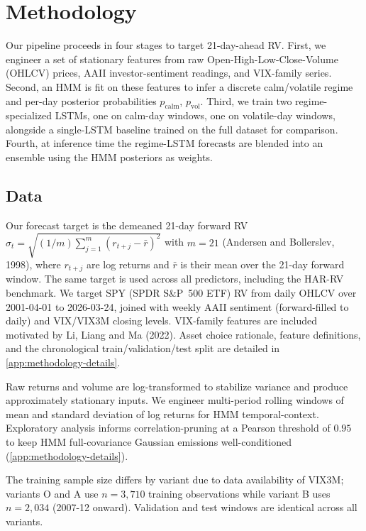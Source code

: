 \documentclass{article}
\begin{document}
\section{Methodology}

Our pipeline proceeds in four stages to target 21-day-ahead RV. First, we engineer a set of stationary features from raw Open-High-Low-Close-Volume (OHLCV) prices, AAII
  investor-sentiment readings, and VIX-family series. Second, an HMM is fit on these features to infer a discrete calm/volatile regime and per-day posterior
  probabilities $p_{\mathrm{calm}}$, $p_{\mathrm{vol}}$. Third, we train two regime-specialized LSTMs, one on calm-day windows, one on volatile-day windows, alongside a
  single-LSTM baseline trained on the full dataset for comparison. Fourth, at inference time the regime-LSTM forecasts are blended into an ensemble using the HMM posteriors as
   weights.

\subsection{Data}
Our forecast target is the demeaned 21-day forward RV $\sigma_t = \sqrt{(1/m)\sum_{j=1}^{m} (r_{t+j} - \bar r)^2}$ with $m=21$ (Andersen and Bollerslev, 1998), where $r_{t+j}$ are log returns and $\bar r$ is their mean over the 21-day forward window. The same target is used across all predictors, including the HAR-RV benchmark. We target SPY (SPDR S\&P~500 ETF) RV from daily OHLCV over 2001-04-01 to 2026-03-24, joined with weekly AAII sentiment (forward-filled to daily) and VIX/VIX3M closing levels. VIX-family features are included motivated by Li, Liang and Ma (2022). Asset choice rationale, feature definitions, and the chronological train/validation/test split are detailed in \cref{app:methodology-details}.

  Raw returns and volume are log-transformed to stabilize variance and produce approximately stationary inputs. We engineer multi-period rolling windows of mean and standard deviation of log returns for HMM temporal-context.
  Exploratory analysis informs correlation-pruning at a Pearson threshold of $0.95$ to keep HMM full-covariance Gaussian emissions well-conditioned (\cref{app:methodology-details}).

  The training sample size differs by variant due to data availability of VIX3M; variants O and A use $n{=}3{,}710$ training observations
  while variant B uses $n{=}2{,}034$ (2007-12 onward). Validation and test windows are identical across all variants.
\end{document}
